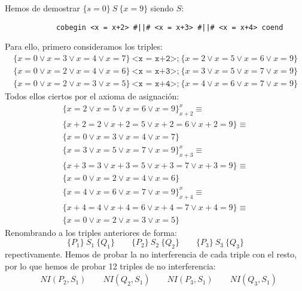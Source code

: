 \documentclass[12pt]{article}
\begin{document}
    \begin{ejercicio}
        Hemos de demostrar $\{s=0\}\ S\ \{x=9\}$ siendo $S$:
        \begin{verbatim}
            cobegin <x = x+2> #||# <x = x+3> #||# <x = x+4> coend
        \end{verbatim}
        Para ello, primero consideramos los triples:
        \begin{gather*}
            \{x=0 \lor x=3 \lor x=4 \lor x=7\}\ \texttt{<x = x+2>;}\ \{x=2 \lor x=5 \lor x=6 \lor x=9\} \\
            \{x=0 \lor x=2 \lor x=4 \lor x=6\}\ \texttt{<x = x+3>;}\ \{x=3 \lor x=5 \lor x=7 \lor x=9\} \\
            \{x=0 \lor x=2 \lor x=3 \lor x=5\}\ \texttt{<x = x+4>;}\ \{x=4 \lor x=6 \lor x=7 \lor x=9\}
        \end{gather*}
        Todos ellos ciertos por el axioma de asignación:
        \begin{multline*}
            \{x=2 \lor x=5 \lor x=6 \lor x=9\}^x_{x+2} \equiv \\  \{x+2=2 \lor x+2=5 \lor x+2=6 \lor x+2=9\} \equiv \\
             \{x=0 \lor x=3 \lor x=4 \lor x=7\} 
        \end{multline*}
        \begin{multline*}
            \{x=3 \lor x=5 \lor x=7 \lor x=9\}^x_{x+3} \equiv \\  \{x+3=3 \lor x+3=5 \lor x+3=7 \lor x+3=9\} \equiv \\
             \{x=0 \lor x=2 \lor x=4 \lor x=6\} 
        \end{multline*}
        \begin{multline*}
            \{x=4 \lor x=6 \lor x=7 \lor x=9\}^x_{x+4} \equiv \\  \{x+4=4 \lor x+4=6 \lor x+4=7 \lor x+4=9\} \equiv \\
             \{x=0 \lor x=2 \lor x=3 \lor x=5\} 
        \end{multline*}
        Renombrando a los triples anteriores de forma:
        \begin{equation*}
            \{P_1\}\ S_1\ \{Q_1\} \qquad \{P_2\}\ S_2\ \{Q_2\} \qquad \{P_3\}\ S_3\ \{Q_3\}
        \end{equation*}
        repectivamente. Hemos de probar la no interferencia de cada triple con el resto, por lo que hemos de probar 12 triples de no interferencia:
        \begin{align*}
            &NI(P_2, S_1) \qquad NI(Q_2, S_1) \qquad NI(P_3, S_1) \qquad NI(Q_3, S_1) \\

\end{align*}
\end{ejercicio}
\end{document}
